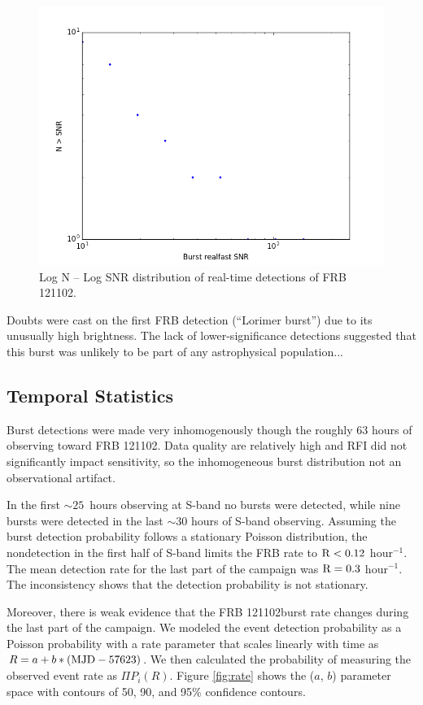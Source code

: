 \documentclass{emulateapj}
\newcommand{\frb}{FRB 121102}
\begin{document}
\begin{figure}[htb]
\begin{center}
\includegraphics[width=0.9\columnwidth]{logns}
\caption{Log N -- Log SNR distribution of real-time detections of FRB 121102.
\label{fig:logns}}
\end{center}
\end{figure}

Doubts were cast on the first FRB detection (``Lorimer burst'') due to its unusually high brightness. The lack of lower-significance detections suggested that this burst was unlikely to be part of any astrophysical population...

\subsection{Temporal Statistics}

Burst detections were made very inhomogenously though the roughly 63 hours of observing toward FRB 121102. Data quality are relatively high and RFI did not significantly impact sensitivity, so the inhomogeneous burst distribution not an observational artifact.

In the first $\sim25$\ hours observing at S-band no bursts were detected, while nine bursts were detected in the last $\sim30$ hours of S-band observing. Assuming the burst detection probability follows a stationary Poisson distribution, the nondetection in the first half of S-band limits the FRB rate to $\rm{R}<0.12$ hour$^{-1}$. The mean detection rate for the last part of the campaign was $\rm{R}=0.3$ hour$^{-1}$. The inconsistency shows that the detection probability is not stationary.

Moreover, there is weak evidence that the \frb burst rate changes during the last part of the campaign. We modeled the event detection probability as a Poisson probability with a rate parameter that scales linearly with time as $R=a + b*(\rm{MJD} - 57623)$. We then calculated the probability of measuring the observed event rate as $\Pi P_i(R)$. Figure \ref{fig:rate} shows the ($a$, $b$) parameter space with contours of 50, 90, and 95\% confidence contours. 
\end{document}
